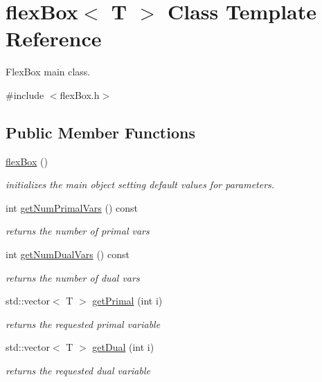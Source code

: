 \hypertarget{classflex_box}{}\section{flex\+Box$<$ T $>$ Class Template Reference}
\label{classflex_box}


Flex\+Box main class.  




{\ttfamily \#include $<$flex\+Box.\+h$>$}

\subsection*{Public Member Functions}
\begin{DoxyCompactItemize}
\item 
\hyperlink{classflex_box_aa325ce1968dc664c0e8e37bdefc25247}{flex\+Box} ()
\begin{DoxyCompactList}\small\item\em initializes the main object setting default values for parameters. \end{DoxyCompactList}\item 
int \hyperlink{classflex_box_a367b7a1fe57fd898ef7ad4159ed14a62}{get\+Num\+Primal\+Vars} () const
\begin{DoxyCompactList}\small\item\em returns the number of primal vars \end{DoxyCompactList}\item 
int \hyperlink{classflex_box_ab6c7512dee891983f60e0f3a63bff8b5}{get\+Num\+Dual\+Vars} () const
\begin{DoxyCompactList}\small\item\em returns the number of dual vars \end{DoxyCompactList}\item 
std\+::vector$<$ T $>$ \hyperlink{classflex_box_ae1c5100eec86603d23d5116ba8d93e9d}{get\+Primal} (int i)
\begin{DoxyCompactList}\small\item\em returns the requested primal variable \end{DoxyCompactList}\item 
std\+::vector$<$ T $>$ \hyperlink{classflex_box_a72828fae47030668e63637f232ed2beb}{get\+Dual} (int i)
\begin{DoxyCompactList}\small\item\em returns the requested dual variable \end{DoxyCompactList}\item 

\end{DoxyCompactItemize}
